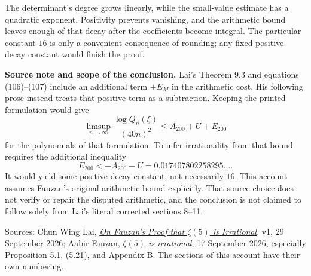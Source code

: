 \documentclass[11pt]{article}
\newcommand{\source}[1]{{\small\color{blue!45!black}#1}\par}
\begin{document}
The determinant's degree grows linearly, while the small-value estimate
has a quadratic exponent. Positivity prevents vanishing, and the arithmetic
bound leaves enough of that decay after the coefficients become integral.
The particular constant $16$ is only a convenient consequence of rounding;
any fixed positive decay constant would finish the proof.

\bigskip
\textbf{Source note and scope of the conclusion.}
Lai's Theorem 9.3 and equations (106)--(107) include an additional term
$+E_M$ in the arithmetic cost. His following prose instead treats that
positive term as a subtraction. Keeping the printed formulation would give
\[
 \limsup_{n\to\infty}\frac{\log Q_n(\xi)}{(40n)^2}
 \leq A_{200}+U+E_{200}
\]
for the polynomials of that formulation. To infer irrationality from that
bound requires the additional inequality
\[
 E_{200}<-A_{200}-U=0.017407802258295\ldots.
\]
It would yield some positive decay constant, not necessarily $16$.
This account assumes Fauzan's original arithmetic bound explicitly.
That source choice does not verify or repair the disputed arithmetic, and
the conclusion is not claimed to follow solely from Lai's literal corrected
sections 8--11.

\source{Sources: Chun Wing Lai,
\href{https://ai.vixra.org/pdf/2609.0080v1.pdf}{\emph{On Fauzan's Proof that $\zeta(5)$ is Irrational}},
v1, 29 September 2026; Aabir Fauzan,
\href{https://zenodo.org/records/22826419}{\emph{$\zeta(5)$ is irrational}},
17 September 2026, especially Proposition 5.1, (5.21), and Appendix B.
The sections of this account have their own numbering.}



\end{document}

